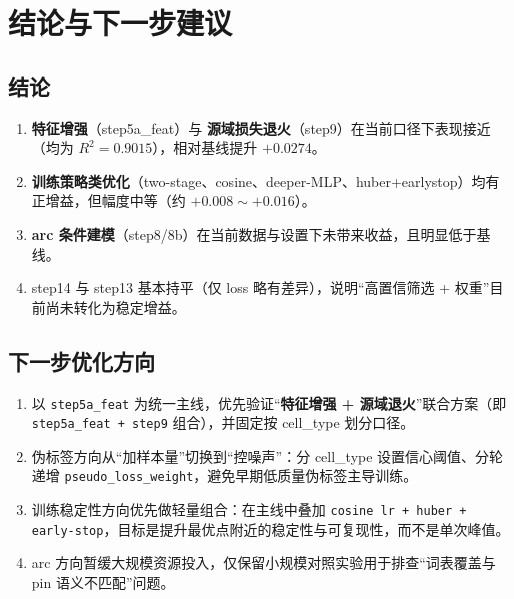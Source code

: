 \documentclass[12pt,a4paper]{ctexart}
\begin{document}
\section{结论与下一步建议}
\subsection{结论}
\begin{enumerate}
  \item \textbf{特征增强}（step5a\_feat）与 \textbf{源域损失退火}（step9）在当前口径下表现接近（均为 \(R^2=0.9015\)），相对基线提升 \(+0.0274\)。
  \item \textbf{训练策略类优化}（two-stage、cosine、deeper-MLP、huber+earlystop）均有正增益，但幅度中等（约 \(+0.008\sim+0.016\)）。
  \item \textbf{arc 条件建模}（step8/8b）在当前数据与设置下未带来收益，且明显低于基线。
  \item step14 与 step13 基本持平（仅 loss 略有差异），说明“高置信筛选 + 权重”目前尚未转化为稳定增益。
\end{enumerate}

\subsection{下一步优化方向}
\begin{enumerate}
  \item 以 \texttt{step5a\_feat} 为统一主线，优先验证“\textbf{特征增强 + 源域退火}”联合方案（即 \texttt{step5a\_feat + step9} 组合），并固定按 cell\_type 划分口径。
  \item 伪标签方向从“加样本量”切换到“控噪声”：分 cell\_type 设置信心阈值、分轮递增 \texttt{pseudo\_loss\_weight}，避免早期低质量伪标签主导训练。
  \item 训练稳定性方向优先做轻量组合：在主线中叠加 \texttt{cosine lr + huber + early-stop}，目标是提升最优点附近的稳定性与可复现性，而不是单次峰值。
  \item arc 方向暂缓大规模资源投入，仅保留小规模对照实验用于排查“词表覆盖与 pin 语义不匹配”问题。
\end{enumerate}
\end{document}
